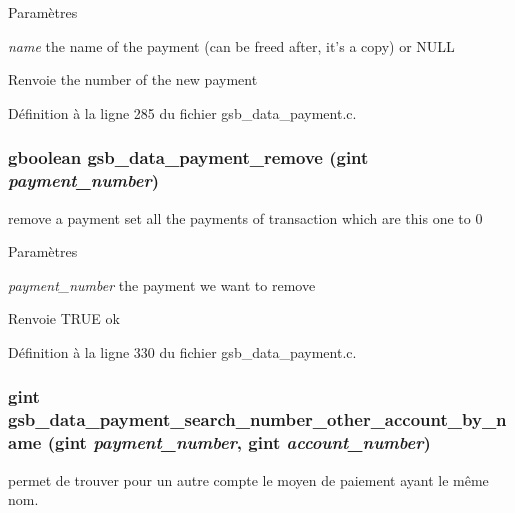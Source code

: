 \begin{DoxyParams}{Paramètres}
\item[{\em name}]the name of the payment (can be freed after, it's a copy) or NULL\end{DoxyParams}
\begin{DoxyReturn}{Renvoie}
the number of the new payment 
\end{DoxyReturn}


Définition à la ligne 285 du fichier gsb\_\-data\_\-payment.c.

\subsubsection[{gsb\_\-data\_\-payment\_\-remove}]{\setlength{\rightskip}{0pt plus 5cm}gboolean gsb\_\-data\_\-payment\_\-remove (gint {\em payment\_\-number})}\label{gsb__data__payment_8c_ace280b004905bd21d550f4e1d15e95bb}
remove a payment set all the payments of transaction which are this one to 0


\begin{DoxyParams}{Paramètres}
\item[{\em payment\_\-number}]the payment we want to remove\end{DoxyParams}
\begin{DoxyReturn}{Renvoie}
TRUE ok 
\end{DoxyReturn}


Définition à la ligne 330 du fichier gsb\_\-data\_\-payment.c.

\subsubsection[{gsb\_\-data\_\-payment\_\-search\_\-number\_\-other\_\-account\_\-by\_\-name}]{\setlength{\rightskip}{0pt plus 5cm}gint gsb\_\-data\_\-payment\_\-search\_\-number\_\-other\_\-account\_\-by\_\-name (gint {\em payment\_\-number}, \/  gint {\em account\_\-number})}\label{gsb__data__payment_8c_a76cc59b81186e59c739cc0eb7727255d}
permet de trouver pour un autre compte le moyen de paiement ayant le même nom.


